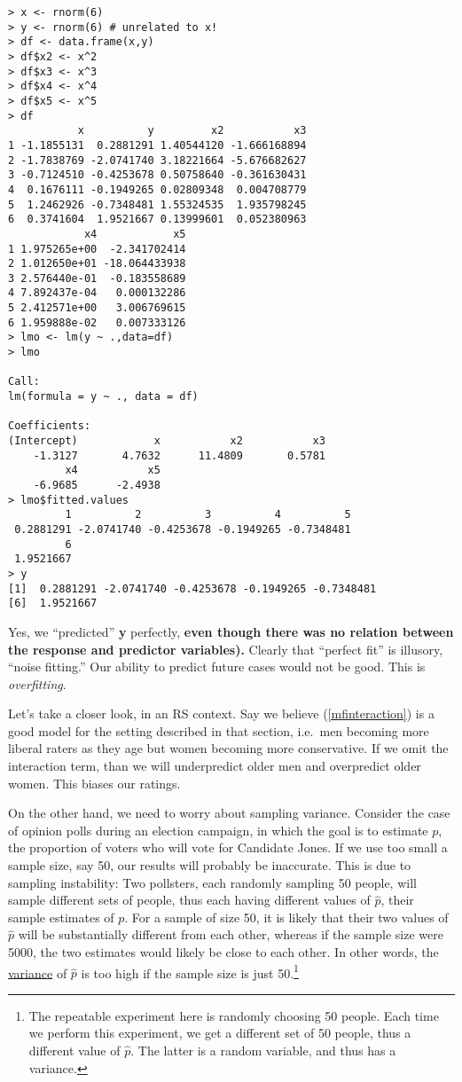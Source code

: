 \begin{lstlisting}
> x <- rnorm(6) 
> y <- rnorm(6) # unrelated to x!
> df <- data.frame(x,y) 
> df$x2 <- x^2 
> df$x3 <- x^3 
> df$x4 <- x^4 
> df$x5 <- x^5 
> df
           x          y         x2           x3
1 -1.1855131  0.2881291 1.40544120 -1.666168894
2 -1.7838769 -2.0741740 3.18221664 -5.676682627
3 -0.7124510 -0.4253678 0.50758640 -0.361630431
4  0.1676111 -0.1949265 0.02809348  0.004708779
5  1.2462926 -0.7348481 1.55324535  1.935798245
6  0.3741604  1.9521667 0.13999601  0.052380963
            x4            x5
1 1.975265e+00  -2.341702414
2 1.012650e+01 -18.064433938
3 2.576440e-01  -0.183558689
4 7.892437e-04   0.000132286
5 2.412571e+00   3.006769615
6 1.959888e-02   0.007333126
> lmo <- lm(y ~ .,data=df) 
> lmo

Call:
lm(formula = y ~ ., data = df)

Coefficients:
(Intercept)            x           x2           x3  
    -1.3127       4.7632      11.4809       0.5781  
         x4           x5  
    -6.9685      -2.4938  
> lmo$fitted.values 
         1          2          3          4          5 
 0.2881291 -2.0741740 -0.4253678 -0.1949265 -0.7348481 
         6 
 1.9521667 
> y
[1]  0.2881291 -2.0741740 -0.4253678 -0.1949265 -0.7348481
[6]  1.9521667
\end{lstlisting}

Yes, we ``predicted'' \textbf{y} perfectly, \textbf{even though there
was no relation between the response and predictor variables).}
Clearly that ``perfect fit'' is illusory, ``noise fitting.''  Our
ability to predict future cases would not be good.  This is
\textit{overfitting}.


Let's take a closer look, in an RS context.  Say we believe
(\ref{mfinteraction}) is a good model for the setting described in that
section, i.e.\ men becoming more liberal raters as they age but women
becoming more conservative.  If we omit the interaction term, than we
will underpredict older men and overpredict older women.  This biases
our ratings.

On the other hand, we need to worry about sampling variance.  Consider
the case of opinion polls during an election campaign, in which the goal
is to estimate $p$, the proportion of voters who will vote for Candidate
Jones.  If we use too small a sample size, say 50, our results will
probably be inaccurate.  This is due to sampling instability:  Two
pollsters, each randomly sampling 50 people, will sample different sets
of people, thus each having different values of $\widehat{p}$, their
sample estimates of $p$.  For a sample of size 50, it is likely that
their two values of $\widehat{p}$ will be substantially different from
each other, whereas if the sample size were 5000, the two estimates
would likely be close to each other.  In other words, the
\underline{variance} of $\widehat{p}$ is too high if the sample size is
just 50.\footnote{The repeatable experiment here is randomly choosing 50
people.  Each time we perform this experiment, we get a different set of
50 people, thus a different value of $\widehat{p}$.  The latter is a
random variable, and thus has a variance.}

